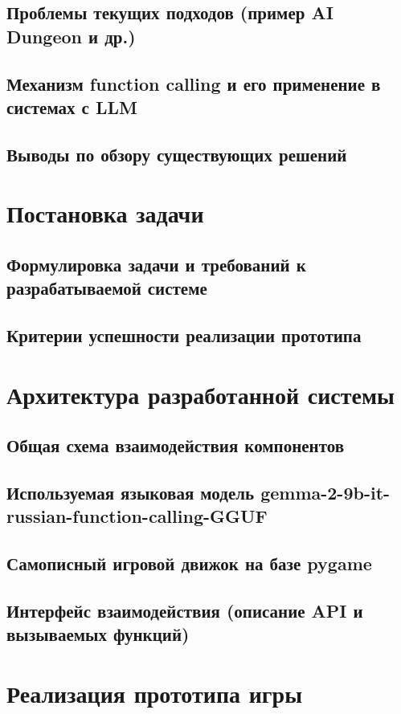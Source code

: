 \documentclass[14pt]{extarticle}
\begin{document}
\subsection{Проблемы текущих подходов (пример AI Dungeon и др.)}
\subsection{Механизм function calling и его применение в системах с LLM}
\subsection{Выводы по обзору существующих решений}

\section{Постановка задачи}
\subsection{Формулировка задачи и требований к разрабатываемой системе}
\subsection{Критерии успешности реализации прототипа}

\section{Архитектура разработанной системы}
\subsection{Общая схема взаимодействия компонентов}
\subsection{Используемая языковая модель gemma-2-9b-it-russian-function-calling-GGUF}
\subsection{Самописный игровой движок на базе pygame}
\subsection{Интерфейс взаимодействия (описание API и вызываемых функций)}

\newpage
\section{Реализация прототипа игры}
\end{document}
